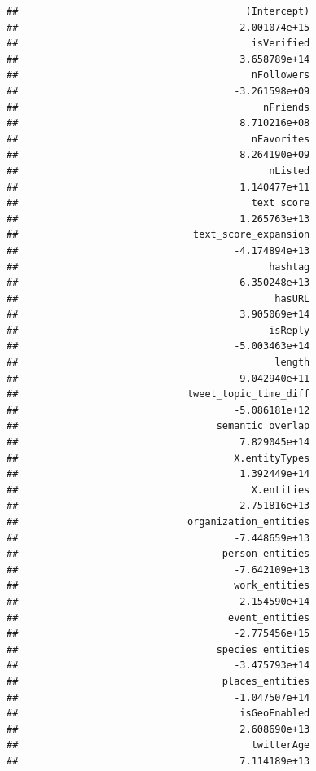\documentclass[
]{article}
\begin{document}
\begin{verbatim}
##                                       (Intercept) 
##                                     -2.001074e+15 
##                                        isVerified 
##                                      3.658789e+14 
##                                        nFollowers 
##                                     -3.261598e+09 
##                                          nFriends 
##                                      8.710216e+08 
##                                        nFavorites 
##                                      8.264190e+09 
##                                           nListed 
##                                      1.140477e+11 
##                                        text_score 
##                                      1.265763e+13 
##                              text_score_expansion 
##                                     -4.174894e+13 
##                                           hashtag 
##                                      6.350248e+13 
##                                            hasURL 
##                                      3.905069e+14 
##                                           isReply 
##                                     -5.003463e+14 
##                                            length 
##                                      9.042940e+11 
##                             tweet_topic_time_diff 
##                                     -5.086181e+12 
##                                  semantic_overlap 
##                                      7.829045e+14 
##                                     X.entityTypes 
##                                      1.392449e+14 
##                                        X.entities 
##                                      2.751816e+13 
##                             organization_entities 
##                                     -7.448659e+13 
##                                   person_entities 
##                                     -7.642109e+13 
##                                     work_entities 
##                                     -2.154590e+14 
##                                    event_entities 
##                                     -2.775456e+15 
##                                  species_entities 
##                                     -3.475793e+14 
##                                   places_entities 
##                                     -1.047507e+14 
##                                      isGeoEnabled 
##                                      2.608690e+13 
##                                        twitterAge 
##                                      7.114189e+13 

\end{verbatim}
\end{document}
